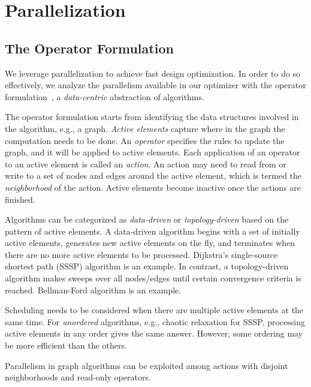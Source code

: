\section{Parallelization}
\label{sec:parallel}

\subsection{The Operator Formulation}

We leverage parallelization to achieve fast design optimization. In order to do so effectively, we analyze the parallelism available in our optimizer with the operator formulation~\cite{pingali11}, a {\em data-centric} abstraction of algorithms.

The operator formulation starts from identifying the data structures involved in the algorithm, e.g., a graph. {\em Active elements} capture where in the graph the computation needs to be done. An {\em operator} specifies the rules to update the graph, and it will be applied to active elements. Each application of an operator to an active element is called an {\em action}. An action may need to read from or write to a set of nodes and edges around the active element, which is termed the {\em neighborhood} of the action. Active elements become inactive once the actions are finished.

Algorithms can be categorized as {\em data-driven} or {\em topology-driven} based on the pattern of active elements. A data-driven algorithm begins with a set of initially active elements, generates new active elements on the fly, and terminates when there are no more active elements to be processed. Dijkstra's single-source shortest path (SSSP) algorithm is an example. In contrast, a topology-driven algorithm makes sweeps over all nodes/edges until certain convergence criteria is reached. Bellman-Ford algorithm is an example.

Scheduling needs to be considered when there are multiple active elements at the same time. For {\em unordered} algorithms, e.g., chaotic relaxation for SSSP, processing active elements in any order gives the same answer. However, some ordering may be more efficient than the others.


Parallelism in graph algorithms can be exploited among actions with disjoint neighborhoods and read-only operators.

